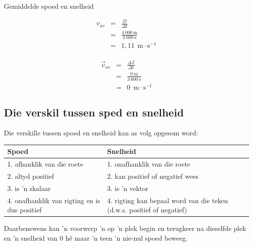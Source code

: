\begin{wex}{Gemiddelde spoed en snelheid}
{
\begin{eqnarray*}
v_{av}&=&\frac{D}{\Delta t}\\
&=&\frac{4\ 000\ \text{m}}{3\ 600\ \text{s}}\\
&=&1,11\ ~\text{m}\cdot \text{s}^{-1}
\end{eqnarray*}

\begin{eqnarray*}
{\vec{v}_{av}}&=&\frac{\Delta \vec{x}}{\Delta t}\\
&=&\frac{0\ \text{m}}{3\ 600\ \text{s}}\\
&=& 0\ ~\text{m}\cdot \text{s}^{-1}
\end{eqnarray*}}
\end{wex}


\subsection*{Die verskil tussen sped en snelheid}
Die verskille tussen spoed en snelheid kan as volg opgesom word:\par
\begin{center}
\begin{tabular}{|p{5cm}|p{5cm}|}\hline
\textbf{Spoed} & \textbf{Snelheid} \\\hline
1. afhanklik van die roete & 1. onafhanklik van die roete \\\hline
2. altyd positief & 2. kan positief of negatief wees \\\hline
3. is  'n skalaar & 3. is  'n vektor \\\hline
4. onafhanklik van rigting en is dus positief & 4. rigting kan bepaal word van die teken (d.w.s. positief of negatief) \\\hline
\end{tabular}
\end{center}
    \par
Daarbenewens kan  'n voorwerp  'n op  'n plek begin en terugkeer na dieselfde plek en  'n snelheid van 0 h\^e maar  'n teen  'n nie-nul spoed beweeg. \par


